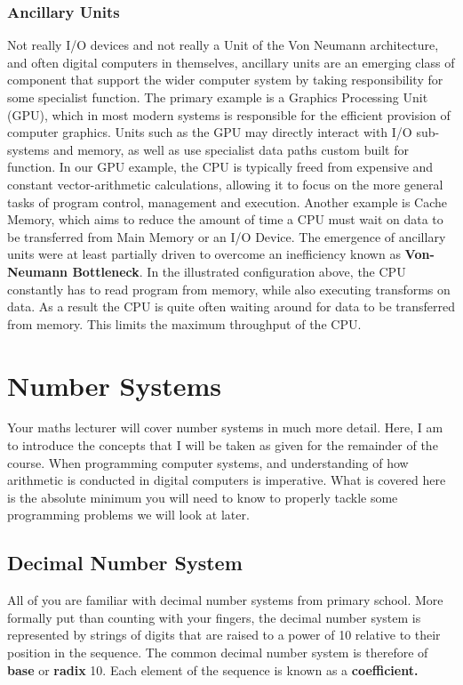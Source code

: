 \documentclass[10pt,a4paper]{article}
\begin{document}
\subsubsection{Ancillary Units}
Not really I/O devices and not really a Unit of the Von Neumann architecture, and often digital computers in themselves, ancillary units are an emerging class of component that support the wider computer system by taking responsibility for some specialist function. The primary example is a Graphics Processing Unit (GPU), which in most modern systems is responsible for the efficient provision of computer graphics. Units such as the GPU may directly interact with I/O sub-systems and memory, as well as use specialist data paths custom built for function. In our GPU example, the CPU is typically freed from expensive and constant vector-arithmetic calculations, allowing it to focus on the more general tasks of program control, management and execution. Another example is Cache Memory, which aims to reduce the amount of time a CPU must wait on data to be transferred from Main Memory or an I/O Device.
\newline
\newline
The emergence of ancillary units were at least partially driven to overcome an inefficiency known as {\bf Von-Neumann Bottleneck}. In the illustrated configuration above, the CPU constantly has to read program from memory, while also executing transforms on data. As a result the CPU is quite often waiting around for data to be transferred from memory. This limits the maximum throughput of the CPU. 

\section{Number Systems}
Your maths lecturer will cover number systems in much more detail. Here, I am to introduce the concepts that I will be taken as given for the remainder of the course. When programming computer systems, and understanding of how arithmetic is conducted in digital computers is imperative. What is covered here is the absolute minimum you will need to know to properly tackle some programming problems we will look at later.  
\subsection{Decimal Number System}
All of you are familiar with decimal number systems from primary school. More formally put than counting with your fingers, the decimal number system is represented by strings of digits that are raised to a power of 10 relative to their position in the sequence. The common decimal number system is therefore of {\bf base} or {\bf radix} 10. Each element of the sequence is known as a {\bf coefficient.} 
\end{document}
